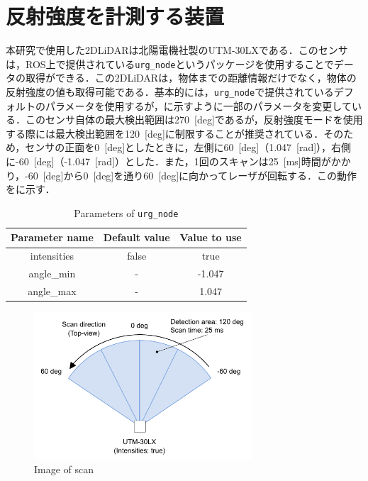 
\section{反射強度を計測する装置}

  本研究で使用した2DLiDARは北陽電機社製のUTM-30LX\cite{hokuyo}である．このセンサは，ROS上で提供されている\texttt{urg\_node}\cite{urg_node}というパッケージを使用することでデータの取得ができる．この2DLiDARは，物体までの距離情報だけでなく，物体の反射強度の値も取得可能である．基本的には，\texttt{urg\_node}で提供されているデフォルトのパラメータを使用するが，に示すように一部のパラメータを変更している．このセンサ自体の最大検出範囲は270 \,[deg]であるが，反射強度モードを使用する際には最大検出範囲を120 \,[deg]に制限することが推奨されている\cite{urg_node}．そのため，センサの正面を0 \,[deg]としたときに，左側に60 \,[deg]（1.047 \,[rad]），右側に-60 \,[deg]（-1.047 \,[rad]）とした．また，1回のスキャンは25 \,[ms]時間がかかり，-60 \,[deg]から0 \,[deg]を通り60 \,[deg]に向かってレーザが回転する．この動作をに示す．

  \begin{table}[hbtp]
    \caption{Parameters of \texttt{urg\_node}}
    \label{tab:parameters_of_urg_node}
    \centering
    \begin{tabular}{ccc}
    \hline
    Parameter name & Default value & Value to use \\ 
    \hline
    \hline
    intensities & false   & true         \\ 
    angle\_min  & -       & -1.047       \\ 
    angle\_max  & -       & 1.047        \\ 
    \hline
    \end{tabular}
    \end{table}

    \vspace{-0.5cm}

    \begin{figure}[h]
      \centering
      \includegraphics[height=5.5cm] {images/pdf/RobotGuidance_hokuyo_scan}
      \captionsetup{justification=raggedright} %
      \caption{Image of scan}
      \label{Fig:Image of scan}
    \end{figure}

\newpage